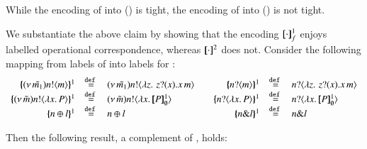\begin{proposition}\label{p:tight}
While the encoding of \HOp into \HO () is tight, the encoding of \HOp into \sessp () is not tight.
\end{proposition}

\noi We substantiate the above claim by showing that the encoding $[\!\![\cdot]\!\!]^1_f$ enjoys 
labelled operational correspondence, whereas $[\!\![\cdot]\!\!]^2$ does not. 
Consider the following mapping from labels of
\HOp into labels for \HO:
\[
	\begin{array}{rclcrcl}
		\mapa{\news{\tilde{m_1}}\bactout{n}{m}}^{1}	&\defeq&	\news{\tilde{m_1}}\bactout{n}{\abs{z}{\,\binp{z}{x} \appl{x}{m}} }
		& &
		\mapa{\bactinp{n}{m}}^{1}			&\defeq&	\bactinp{n}{\abs{z}{\,\binp{z}{x} \appl{x}{m}} }
		\\
		\mapa{\news{\tilde{m}}\bactout{n}{\abs{x}{P}}}^{1} &\defeq& \news{\tilde{m}}\bactout{n}{\abs{x}{\pmapp{P}{1}{\es}}}
		& &
		\mapa{\bactinp{n}{\abs{x}{P}}}^{1} &\defeq& \bactinp{n}{\abs{x}{\pmapp{P}{1}{\es}}}
		\\
		\mapa{\bactsel{n}{l} }^{1} &\defeq& \bactsel{n}{l} 
		& &
		\mapa{\bactbra{n}{l} }^{1} &\defeq& \bactbra{n}{l} 
	\end{array}
\]



Then the following result, a complement of , holds:

